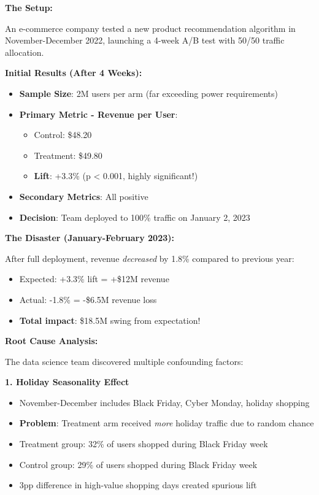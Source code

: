 \textbf{The Setup:}

An e-commerce company tested a new product recommendation algorithm in November-December 2022, launching a 4-week A/B test with 50/50 traffic allocation.

\textbf{Initial Results (After 4 Weeks):}
\begin{itemize}
    \item \textbf{Sample Size}: 2M users per arm (far exceeding power requirements)
    \item \textbf{Primary Metric - Revenue per User}:
    \begin{itemize}
        \item Control: \$48.20
        \item Treatment: \$49.80
        \item \textbf{Lift}: +3.3\% (p < 0.001, highly significant!)
    \end{itemize}
    \item \textbf{Secondary Metrics}: All positive
    \item \textbf{Decision}: Team deployed to 100\% traffic on January 2, 2023
\end{itemize}

\textbf{The Disaster (January-February 2023):}

After full deployment, revenue \textit{decreased} by 1.8\% compared to previous year:
\begin{itemize}
    \item Expected: +3.3\% lift = +\$12M revenue
    \item Actual: -1.8\% = -\$6.5M revenue loss
    \item \textbf{Total impact}: \$18.5M swing from expectation!
\end{itemize}

\textbf{Root Cause Analysis:}

The data science team discovered multiple confounding factors:

\textbf{1. Holiday Seasonality Effect}
\begin{itemize}
    \item November-December includes Black Friday, Cyber Monday, holiday shopping
    \item \textbf{Problem}: Treatment arm received \textit{more} holiday traffic due to random chance
    \item Treatment group: 32\% of users shopped during Black Friday week
    \item Control group: 29\% of users shopped during Black Friday week
    \item 3pp difference in high-value shopping days created spurious lift
\end{itemize}

